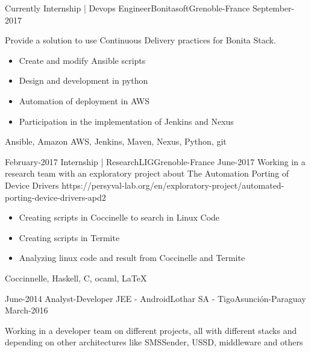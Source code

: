 %
%
%
\begin{experiences}
  \experience
    {Currently}   {Internship | Devops Engineer}{Bonitasoft}{Grenoble-France}
    {September-2017}
                    {Provide a solution to use Continuous Delivery practices for Bonita Stack.
                    \begin{itemize}
                        \item Create and modify Ansible scripts
                        \item Design and development in python
                        \item Automation of deployment in AWS
                        \item Participation in the implementation of Jenkins and Nexus
                      \end{itemize}}
                    {Ansible, Amazon AWS, Jenkins, Maven, Nexus, Python, git}
  \emptySeparator

    \projectexperiences
    {February-2017}   {Internship | Research}{LIG}{Grenoble-France}
    {June-2017}
                    {Working in a research team with an exploratory project about The Automation Porting of Device Drivers \tiny{https://persyval-lab.org/en/exploratory-project/automated-porting-device-drivers-apd2}}
                    {
                    \begin{itemize}
                        \item Creating scripts in Coccinelle to search in Linux Code
                        \item Creating scripts in Termite
                        \item Analyzing linux code and result from Coccinelle and Termite
                      \end{itemize}
                     }
                    {Coccinnelle, Haskell, C, ocaml, \LaTeX}
  \emptySeparator

  \projectexperiences
    {June-2014}   {Analyst-Developer JEE - Android}{Lothar SA - Tigo}{Asunción-Paraguay}
    {March-2016} {

                    Working in a developer team on different projects, all with different stacks and depending on other architectures like SMSSender, USSD, middleware and others}
                {

}
\end{experiences}

